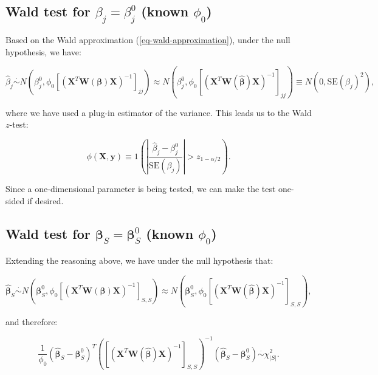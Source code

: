 \documentclass[
  11pt,
  letterpaper,
  oneside]{book}
\theoremstyle{plain}
\theoremstyle{plain}
\theoremstyle{definition}
\theoremstyle{definition}
\theoremstyle{plain}
\theoremstyle{remark}
\begin{document}
\hypertarget{sec-wald-test-single-coeff}{%
\subsection{\texorpdfstring{Wald test for \(\beta_j = \beta_j^0\) (known
\(\phi_0\))}{Wald test for \textbackslash beta\_j = \textbackslash beta\_j\^{}0 (known \textbackslash phi\_0)}}\label{sec-wald-test-single-coeff}}

Based on the Wald approximation (\ref{eq-wald-approximation}), under the
null hypothesis, we have:

\[
\widehat \beta_j \overset{\cdot}{\sim} N(\beta_j^0, \phi_0[(\boldsymbol{X}^T \boldsymbol{W}(\boldsymbol{\beta}) \boldsymbol{X})^{-1}]_{jj}) \approx N(\beta_j^0, \phi_0[(\boldsymbol{X}^T \boldsymbol{W}(\boldsymbol{\widehat \beta}) \boldsymbol{X})^{-1}]_{jj}) \equiv N(0, \text{SE}(\beta_j)^2),
\]

where we have used a plug-in estimator of the variance. This leads us to
the Wald \(z\)-test:

\[
\phi(\boldsymbol{X}, \boldsymbol{y}) \equiv 1\left(\left|\frac{\widehat \beta_j - \beta_j^0}{\text{SE}(\beta_j)}\right| > z_{1-\alpha/2}\right).
\]

Since a one-dimensional parameter is being tested, we can make the test
one-sided if desired.

\hypertarget{sec-wald-test-group-coeff}{%
\subsection{\texorpdfstring{Wald test for
\(\boldsymbol{\beta}_S = \boldsymbol{\beta}_S^0\) (known
\(\phi_0\))}{Wald test for \textbackslash boldsymbol\{\textbackslash beta\}\_S = \textbackslash boldsymbol\{\textbackslash beta\}\_S\^{}0 (known \textbackslash phi\_0)}}\label{sec-wald-test-group-coeff}}

Extending the reasoning above, we have under the null hypothesis that:

\[
\boldsymbol{\widehat \beta}_S \overset{\cdot}{\sim} N(\boldsymbol{\beta}_S^0, \phi_0[(\boldsymbol{X}^T \boldsymbol{W}(\boldsymbol{\beta}) \boldsymbol{X})^{-1}]_{S,S}) \approx N(\boldsymbol{\beta}_S^0, \phi_0[(\boldsymbol{X}^T \boldsymbol{W}(\boldsymbol{\widehat \beta}) \boldsymbol{X})^{-1}]_{S,S}),
\]

and therefore:

\[
\frac{1}{\phi_0} (\boldsymbol{\widehat \beta}_S - \boldsymbol{\beta}_S^0)^T \left([(\boldsymbol{X}^T \boldsymbol{W}(\boldsymbol{\widehat \beta}) \boldsymbol{X})^{-1}]_{S,S}\right)^{-1}(\boldsymbol{\widehat \beta}_S - \boldsymbol{\beta}_S^0) \overset{\cdot}{\sim} \chi^2_{|S|}.
\]
\end{document}
